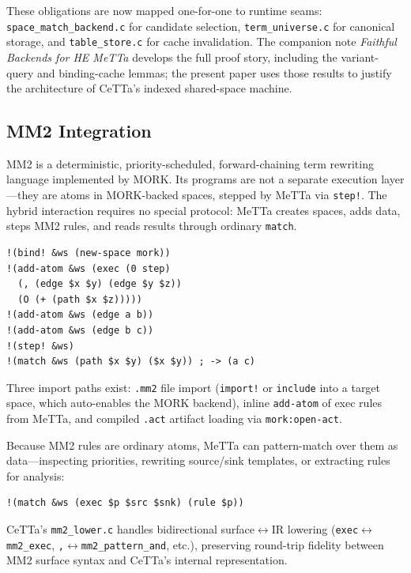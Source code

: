 \documentclass[11pt]{article}
\newcommand{\code}[1]{\texttt{#1}}
\newcommand{\CeTTa}{\textup{CeTTa}}
\begin{document}
These obligations are now mapped one-for-one to runtime seams:
\code{space\_match\_backend.c} for candidate selection, \code{term\_universe.c}
for canonical storage, and \code{table\_store.c} for cache invalidation.  The
companion note \emph{Faithful Backends for HE MeTTa} develops the full proof
story, including the variant-query and binding-cache lemmas; the present
paper uses those results to justify the architecture of \CeTTa{}'s indexed
shared-space machine.

\subsection{MM2 Integration}

MM2 is a deterministic, priority-scheduled, forward-chaining term rewriting
language implemented by MORK\@.  Its programs are not a separate execution
layer---they are atoms in MORK-backed spaces, stepped by MeTTa via
\code{step!}.  The hybrid interaction requires no special protocol: MeTTa
creates spaces, adds data, steps MM2 rules, and reads results through ordinary
\code{match}.

\begin{verbatim}
!(bind! &ws (new-space mork))
!(add-atom &ws (exec (0 step)
  (, (edge $x $y) (edge $y $z))
  (O (+ (path $x $z)))))
!(add-atom &ws (edge a b))
!(add-atom &ws (edge b c))
!(step! &ws)
!(match &ws (path $x $y) ($x $y)) ; -> (a c)
\end{verbatim}

Three import paths exist: \code{.mm2} file import (\code{import!} or
\code{include} into a target space, which auto-enables the MORK backend),
inline \code{add-atom} of exec rules from MeTTa, and compiled \code{.act}
artifact loading via \code{mork:open-act}.

Because MM2 rules are ordinary atoms, MeTTa can pattern-match over them as
data---inspecting priorities, rewriting source/sink templates, or extracting
rules for analysis:
\begin{verbatim}
!(match &ws (exec $p $src $snk) (rule $p))
\end{verbatim}

\CeTTa{}'s \code{mm2\_lower.c} handles bidirectional
surface$\leftrightarrow$IR lowering
(\code{exec}$\leftrightarrow$\code{mm2\_exec},
\code{,}$\leftrightarrow$\code{mm2\_pattern\_and}, etc.), preserving
round-trip fidelity between MM2 surface syntax and \CeTTa{}'s internal
representation.

\end{document}
